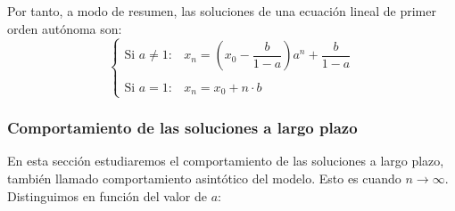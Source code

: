 Por tanto, a modo de resumen, las soluciones de una ecuación lineal de primer orden autónoma son:
$$\left\{ \begin{array}{ll}
    \text{Si } a \neq 1: & x_n = \left( x_0 - \dfrac{b}{1-a} \right)a^n + \dfrac{b}{1-a} \\ \\
    \text{Si } a = 1: & x_n = x_0 + n \cdot b
\end{array}\right.$$

\subsubsection{Comportamiento de las soluciones a largo plazo}

En esta sección estudiaremos el comportamiento de las soluciones a largo plazo, también llamado comportamiento asintótico del modelo. Esto es cuando $n\to \infty$. Distinguimos en función del valor de $a$:

